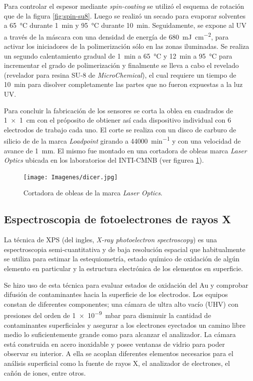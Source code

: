 		Para controlar el espesor mediante \textit{spin-coating} se utilizó el esquema de rotación que de la figura \ref{fig:spin-su8}. Luego se realizó un secado para evaporar solventes a \SI{65}{\celsius} durante \SI{1}{\minute} y \SI{95}{\celsius} durante \SI{10}{\minute}. Seguidamente, se expone al UV a través de la máscara con una densidad de energía de \SI{680}{mJ.cm^{-2}}, para activar los iniciadores de la polimerización sólo en las zonas iluminadas. Se realiza un segundo calentamiento gradual de \SI{1}{\minute} a \SI{65}{\celsius} y \SI{12}{\minute} a \SI{95}{\celsius} para incrementar el grado de polimerización y finalmente se lleva a cabo el revelado (revelador para resina SU-8 de \textit{MicroChemical}), el cual requiere un tiempo de \SI{10}{\minute} para disolver completamente las partes que no fueron expuestas a la luz UV. 
		
		Para concluir la fabricación de los sensores se corta la oblea en cuadrados de \SI{1x1}{\cm} con el próposito de obtiener así cada dispositivo individual con 6 electrodos de trabajo cada uno. El corte se realiza con un disco de carburo de silicio de  de la marca \textit{Loadpoint} girando a \SI{44000}{\minute^{-1}} y con una velocidad de avance de \SI{1}{\mm}. El mismo fue montado en una cortadora de obleas marca \textit{Laser Optics} ubicada en los laboratorios del INTI-CMNB (ver figurea \ref{fig:dicer}).
			\begin{figure}[ht]
			 		  \begin{center}
			 		  \texttt{[image: Imagenes/dicer.jpg]}
			 		  \caption[Cortadora de obleas]{Cortadora de obleas de la marca \textit{Laser Optics}.}
			 		  \label{fig:dicer}
			 		  \end{center}
			 		  \end{figure}

	\subsection{Espectroscopia de fotoelectrones de rayos X}

		La técnica de XPS (del ingles, \textit {X-ray photoelectron spectroscopy}) es una espectroscopia semi-cuantitativa y de baja resolución espacial que habitualmente se utiliza para estimar la estequiometría, estado químico de oxidación de algún elemento en particular y la estructura electrónica de los elementos en superficie.\cite{siegbahn1956,siegbahn1981}

		Se hizo uso de esta técnica para evaluar estados de oxidación del Au y comprobar difusión de contaminantes hacia la superficie de los electrodos.  Los equipos constan de diferentes componentes; una cámara de ultra alto vacío (UHV) con presiones del orden de \SI{1e-9}{mbar} para disminuir la cantidad de contaminantes superficiales y asegurar a los electrones eyectados un camino libre medio lo suficientemente grande como para alcanzar el analizador. La cámara está construida en acero inoxidable y posee ventanas de vidrio para poder observar su interior. A ella se acoplan diferentes elementos necesarios para el análisis superficial como la fuente de rayos X, el analizador de electrones, el cañón de iones, entre otros.\cite{XPS1978,Corthey2012}


